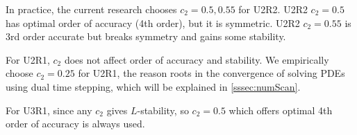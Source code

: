 In practice, the current research chooses $c_2=0.5,0.55$ for U2R2.
U2R2 $c_2=0.5$ has optimal order of accuracy (4th order), but it is symmetric.
U2R2 $c_2=0.55$ is 3rd order accurate but breaks symmetry and gains some stability.

For U2R1, $c_2$ does not affect order of accuracy and stability.
We empirically choose $c_2=0.25$ for U2R1, the reason roots in
the convergence of solving PDEs using
dual time stepping, which will be explained in \ref{sssec:numScan}.

For U3R1, since any $c_2$ gives $L$-stability, so $c_2=0.5$ which
offers optimal 4th order of accuracy is always used.








